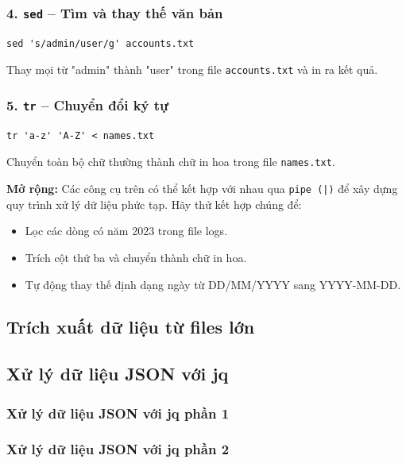 \documentclass[11pt]{article}
\begin{document}
\vspace{0.5em}
\subsubsection*{4. \texttt{sed} – Tìm và thay thế văn bản}
\begin{verbatim}
sed 's/admin/user/g' accounts.txt
\end{verbatim}
Thay mọi từ "admin" thành "user" trong file \texttt{accounts.txt} và in ra kết quả.

\vspace{0.5em}
\subsubsection*{5. \texttt{tr} – Chuyển đổi ký tự}
\begin{verbatim}
tr 'a-z' 'A-Z' < names.txt
\end{verbatim}
Chuyển toàn bộ chữ thường thành chữ in hoa trong file \texttt{names.txt}.

\vspace{1em}
\noindent
\textbf{Mở rộng:}
Các công cụ trên có thể kết hợp với nhau qua \texttt{pipe (|)} để xây dựng quy trình xử lý dữ liệu phức tạp. Hãy thử kết hợp chúng để:
\begin{itemize}
  \item Lọc các dòng có năm 2023 trong file logs.
  \item Trích cột thứ ba và chuyển thành chữ in hoa.
  \item Tự động thay thế định dạng ngày từ DD/MM/YYYY sang YYYY-MM-DD.
\end{itemize}


\subsection{Trích xuất dữ liệu từ files lớn}

\subsection{Xử lý dữ liệu JSON với jq}

\subsubsection{Xử lý dữ liệu JSON với jq phần 1}

\subsubsection{Xử lý dữ liệu JSON với jq phần 2}
\end{document}
